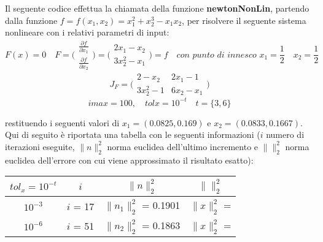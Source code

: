 Il seguente codice effettua la chiamata della funzione \textbf{newtonNonLin}, partendo dalla funzione 
$f = f(x_1,x_2)=x_1^2+x_2^3-x_1x_2$, per risolvere il seguente sistema nonlineare con i relativi parametri di input:
	\[
	F(x)=0 \quad
	F=\Bigg(\begin{matrix}
		\frac{\partial f}{\partial x_1} \\
		\frac{\partial f}{\partial x_2} 
	\end{matrix}\Bigg) = 
	\Bigg(\begin{matrix}
		2x_1-x_2 \\
		3x_2^2-x_1
	\end{matrix}\Bigg)=f \quad
	\textit{con punto di innesco } x_1=\frac{1}{2} \quad x_2=\frac{1}{2}
	\]
	\[
	J_F=\Bigg(\begin{matrix}
		2-x_2 & 2x_1-1 \\
		3x_2^2-1 & 6x_2-x_1 
	\end{matrix}\Bigg)
	\]
	\[
	imax=100, \quad 
	tolx=10^{-t} \quad t=\{3,6\}
	\]

restituendo i seguenti valori di $x_1 = (0.0825 , 0.169)$ e $x_2 = (0.0833 , 0.1667)$.
Qui di seguito è riportata una tabella con le seguenti informazioni ($i$ numero di iterazioni eseguite, $\|n\|^2_2$ norma euclidea dell'ultimo incremento e $\|\|^2_2$ norma euclidea dell'errore con cui viene approssimato il risultato esatto):
\begin{center}
	\begin{tabular}{|c|c|c|c|}
		\hline
			$tol_x=10^{-t}$ & $i$ & $\|n\|^2_2$ & $\|\|^2_2$ \\
		\hline
    		$10^{-3}$ & $i$ = 17 & $\|n_1\|^2_2$ = 0.1901 & $\|x\|^2_2$ = \\
    		$10^{-6}$ & $i$ = 51 & $\|n_2\|^2_2$ = 0.1863 & $\|x\|^2_2$ = \\
		\hline
	\end{tabular}
\end{center}